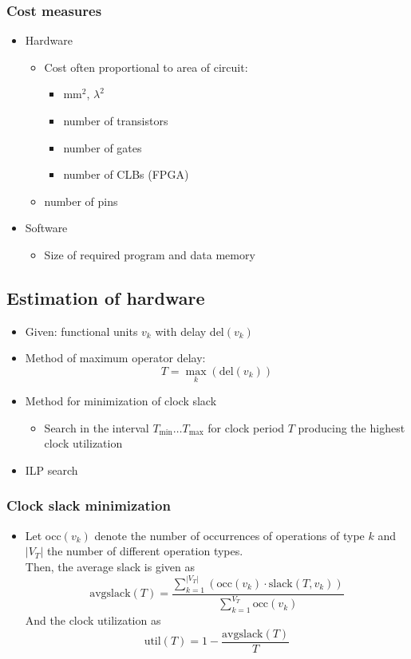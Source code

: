 \subsubsection{Cost measures}
\begin{itemize}
	\item Hardware
\begin{itemize}
	\item Cost often proportional to area of circuit:
\begin{itemize}
	\item mm$^2$, $\lambda^2$
	\item number of transistors
	\item number of gates
	\item number of CLBs (FPGA)
\end{itemize}
	\item number of pins
\end{itemize}
	\item Software
\begin{itemize}
	\item Size of required program and data memory
\end{itemize}
\end{itemize}

\subsection{Estimation of hardware}
\begin{itemize}
	\item Given: functional units $v_k$ with delay del$(v_k)$
	\item Method of maximum operator delay:
$$
	T = \max_k(\text{del}(v_k))
$$
	\item Method for minimization of clock slack
\begin{itemize}
	\item Search in the interval $T_{\min} \dots T_{\max}$ for clock period $T$ producing the highest clock utilization
\end{itemize}
	\item ILP search
\end{itemize}

\subsubsection{Clock slack minimization}
\begin{itemize}
	\item Let occ$(v_k)$ denote the number of occurrences of operations of type $k$ and $|V_T|$ the number of different operation types. \\
		Then, the average slack is given as
		$$
			\text{avgslack}(T) = \frac{\sum_{k=1}^{|V_T|}(\text{occ}(v_k) \cdot \text{slack}(T, v_k))}{\sum_{k=1}^{V_T}\text{occ}(v_k)}
		$$
		And the clock utilization as
		$$
			\text{util}(T) = 1 - \frac{\text{avgslack}(T)}{T}
		$$
\end{itemize}

